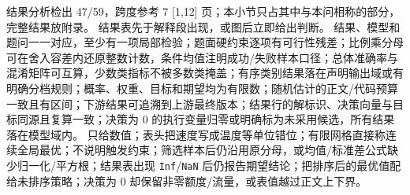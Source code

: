 \documentclass[withoutpreface,bwprint]{cumcmthesis}
\newcommand{\MCMResultLength}{结果分析检出 47/59，跨度参考 7 [1,12] 页}
\begin{document}
  {\MCMResultLength；本小节只占其中与本问相称的部分，完整结果放附录。}
  {结果表先于解释段出现，或图后立即给出判断。}
  {结果、模型和题问一一对应，至少有一项局部检验；题面硬约束逐项有可行性残差；比例乘分母可在舍入容差内还原整数计数，条件均值注明成功/失败样本口径；总体准确率与混淆矩阵可互算，少数类指标不被多数类掩盖；有序类别结果落在声明输出域或有明确分档规则；概率、权重、目标和期望均为有限数；随机估计的正文/代码预算一致且有区间；下游结果可追溯到上游最终版本；结果行的解标识、决策向量与目标同源且复算一致；决策为 0 的执行变量归零或明确标为未采用候选，所有结果落在模型域内。}
  {只给数值；表头把速度写成温度等单位错位；有限网格直接称连续全局最优；不说明触发约束；筛选样本后仍沿用原分母，或均值/标准差公式缺少归一化/平方根；结果表出现 \texttt{Inf}/\texttt{NaN} 后仍报告期望结论；把排序后的最优值配给未排序策略；决策为 0 却保留非零额度/流量，或表值越过正文上下界。}
\end{document}
